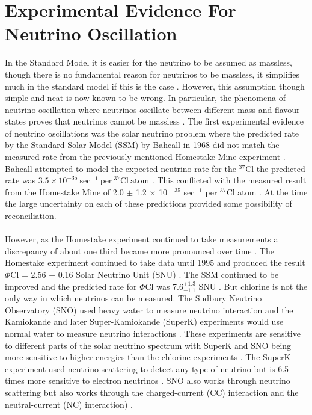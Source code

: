 \section{Experimental Evidence For Neutrino Oscillation}\label{sec:neutrinoFlavours}
In the Standard Model it is easier for the neutrino to be assumed as massless, though there is no fundamental reason for neutrinos to be massless, it simplifies much in the standard model if this is the case \cite{griffiths2008neutrinoOscillations}. However, this assumption though simple and neat is now known to be wrong. In particular, the phenomena of neutrino oscillation where neutrinos oscillate between different mass and flavour states proves that neutrinos cannot be massless \cite{griffiths2008neutrinoOscillations}. The first experimental evidence of neutrino oscillations was the solar neutrino problem where the predicted rate by the Standard Solar Model (SSM) by Bahcall in 1968 did not match the measured rate from the previously mentioned Homestake Mine experiment \cite{griffiths2008neutrinoOscillations}. Bahcall attempted to model the expected neutrino rate for the $^{37}$Cl the predicted rate was $3.5 \times 10 ^{-35} \ \textrm{sec}^{-1} \ \textrm{per} \ ^{37}\textrm{Cl} \ \textrm{atom}$ \cite{bahcall1968present}. This conflicted with the measured result from the Homestake Mine of 2.0 $\pm$ 1.2 $\times$ 10 $^{-35}$ sec$^{-1}$ per $^{37}$Cl atom \cite{davis1968homestake}. At the time the large uncertainty on each of these predictions provided some possibility of reconciliation. 
\\\\However, as the Homestake experiment continued to take measurements a discrepancy of about one third became more pronounced over time \cite{griffiths2008neutrinoOscillations}. The Homestake experiment continued to take data until 1995 and produced the result $\Phi$Cl = 2.56 $\pm$ 0.16 Solar Neutrino Unit (SNU) \cite{Bellerive:2003rj}. The SSM continued to be improved and the predicted rate for $\Phi$Cl was 7.6$^{+ 1.3}_{-1.1}$ SNU \cite{Bellerive:2003rj}. But chlorine is not the only way in which neutrinos can be measured. The Sudbury Neutrino Observatory (SNO) used heavy water to measure neutrino interaction and the Kamiokande and later Super-Kamiokande (SuperK) experiments would use normal water to measure neutrino interactions \cite{Bellerive:2003rj}. These experiments are sensitive to different parts of the solar neutrino spectrum with SuperK and SNO being more sensitive to higher energies than the chlorine experiments \cite{Bellerive:2003rj}. The SuperK experiment used neutrino scattering to detect any type of neutrino but is 6.5 times more sensitive to electron neutrinos \cite{griffiths2008neutrinoOscillations}. SNO also works through neutrino scattering but also works through the charged-current (CC) interaction and  the neutral-current (NC) interaction) \cite{sno2001}\cite{Bellerive:2003rj} \cite{griffiths2008neutrinoOscillations}. 
